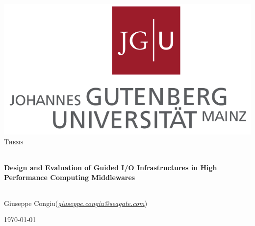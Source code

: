 \thispagestyle{empty}

\begin{center}
 
\includegraphics[scale=0.8]{figures/uni-mainz.png}\\[1cm]

\textsc{\Large Thesis}

\HRule \\[0.4cm]
{ \huge \bfseries Design and Evaluation of Guided I/O Infrastructures in High Performance Computing Middlewares}\\[0.4cm]
 
\HRule \\[2cm]
 
\begin{minipage}{0.9\textwidth}
\begin{flushleft}
\large
Giuseppe Congiu\footnotemark[1] (\emph{\href{mailto:giuseppe.congiu@seagate.com}{giuseppe.congiu@seagate.com}}) \end{flushleft}
\end{minipage}

\vfill
 

{\large \today}

\end{center}

